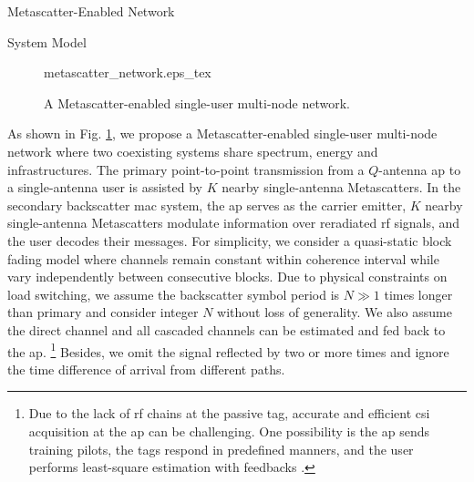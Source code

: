 \documentclass[journal]{IEEEtran}
\begin{document}
\begin{section}{Metascatter-Enabled Network}
	\begin{subsection}{System Model}
		\begin{figure}[!t]
			\centering
			\def\svgwidth{0.8\columnwidth}
			\footnotesize{
				{metascatter_network.eps_tex}
			}
			\caption{A Metascatter-enabled single-user multi-node network.}
			\label{fi:metascatter_network}
		\end{figure}
		As shown in Fig. \ref{fi:metascatter_network}, we propose a Metascatter-enabled single-user multi-node network where two coexisting systems share spectrum, energy and infrastructures.
		The primary point-to-point transmission from a $Q$-antenna \gls{ap} to a single-antenna user is assisted by $K$ nearby single-antenna Metascatters.
		In the secondary backscatter \gls{mac} system, the \gls{ap} serves as the carrier emitter, $K$ nearby single-antenna Metascatters modulate information over reradiated \gls{rf} signals, and the user decodes their messages.
		For simplicity, we consider a quasi-static block fading model where channels remain constant within coherence interval while vary independently between consecutive blocks.
		Due to physical constraints on load switching, we assume the backscatter symbol period is $N \gg 1$ times longer than primary and consider integer $N$ without loss of generality.
		We also assume the direct channel and all cascaded channels can be estimated and fed back to the \gls{ap}.%
		\footnote{
			Due to the lack of \gls{rf} chains at the passive tag, accurate and efficient \gls{csi} acquisition at the \gls{ap} can be challenging.
			One possibility is the \gls{ap} sends training pilots, the tags respond in predefined manners, and the user performs least-square estimation with feedbacks \cite{Bharadia2015,Yang2015b,Guo2019g}.
		}
		Besides, we omit the signal reflected by two or more times\cite{Wu2019} and ignore the time difference of arrival from different paths\cite{Guo2019b}.



\end{subsection}
\end{section}
\end{document}
